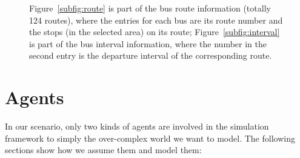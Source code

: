 \documentclass{sig-alternate}
\begin{document}
\begin{figure}
\centering
{}
\caption{Figure~\ref{subfig:route} is part of the bus route information (totally 124 routes), where the entries for each bus are its route number and the stops (in the selected area) on its route; Figure~\ref{subfig:interval} is part of the bus interval information, where the
number in the second entry is the departure interval of the corresponding route.}
\label{fig:bus}
\end{figure}

\section{Agents}

In our scenario, only two kinds of agents are involved in the simulation framework to simply the over-complex world we want to model. 
The following sections show how we assume them and model them:
\end{document}

